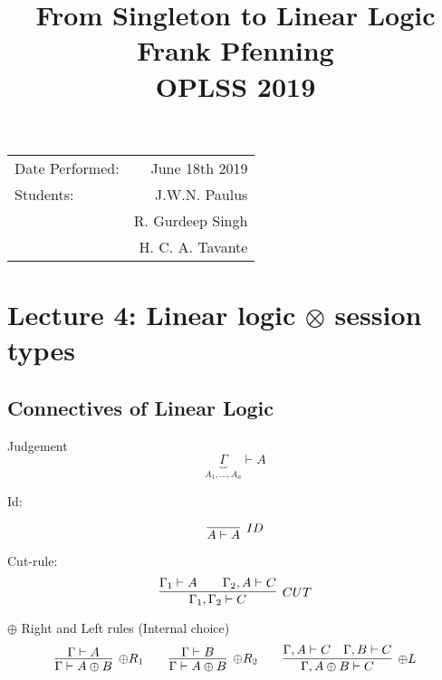 \documentclass{article}
\title{From Singleton to Linear Logic \\ Frank Pfenning \\ OPLSS 2019} %
\begin{document}
	
	\maketitle %
	
	\begin{center}
		\begin{tabular}{l r}
			Date Performed: & June 18th 2019 \\ %
			Students: & J.W.N. Paulus  \\
			& R. Gurdeep Singh \\ %
			& H. C. A. Tavante
		\end{tabular}
	\end{center}
	
	
	\setcounter{section}{3} %
	\section{Lecture 4: Linear logic \(\otimes\) session types}
	\subsection{Connectives of Linear Logic}

	Judgement 
	\[
	\underbrace{\Gamma}_{A_1,...,A_n} \vdash A
	\]

	Id:

	\[
	\infer[\scriptsize{ID}]
	{A \vdash A}
	{}
	\]

	Cut-rule:
	\[
	\infer[\scriptsize{CUT}]
	{\Gamma_{1}, \Gamma_{2} \vdash C}
	{\Gamma_{1} \vdash A \hspace{2em} \Gamma_{2}, A \vdash C}
	\]

  $\oplus$ Right and Left rules (Internal choice)
	\[
	\infer[\oplus\scriptsize{R_1}]
	{\Gamma \vdash A \oplus B}{\Gamma \vdash A}
	\qquad
	\infer[\oplus\scriptsize{R_2}]
	{\Gamma \vdash A \oplus B}{\Gamma \vdash B}
	\qquad
	\infer[\oplus\scriptsize{L}]
	{\Gamma, A \oplus B \vdash C}{\Gamma, A \vdash C \hspace{1em} \Gamma, B \vdash C}
	\]
\end{document}
